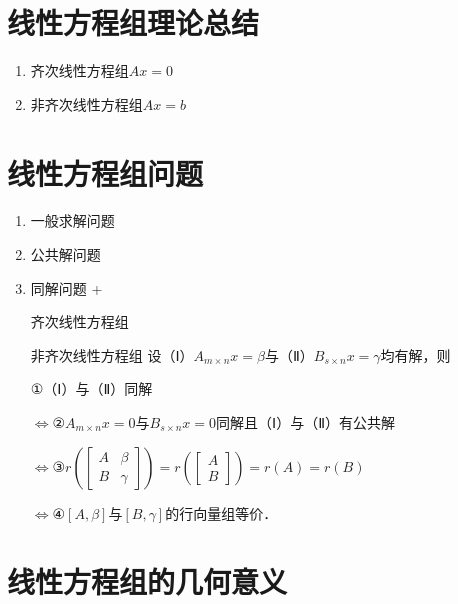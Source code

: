 \section{线性方程组理论总结}
\DOne
\begin{enumerate}
    \item 齐次线性方程组$Ax=0$ \DOne
    \item 非齐次线性方程组$Ax=b$ \DOne
\end{enumerate}


\section{线性方程组问题}
\begin{enumerate}
    \item 一般求解问题
    \item 公共解问题
    \item 同解问题
          \DOne+\DTwoTwo
          \begin{detail}{齐次线性方程组\DTwoTwo}{}
          \end{detail}

          \begin{detail}{非齐次线性方程组\DTwoTwo}{}
              设（\RomanSymbols Ⅰ）$A_{m\times n}x=\beta$与（Ⅱ）$B_{s\times n}x=\gamma$均有解，则

              ①（\RomanSymbols Ⅰ）与（Ⅱ）同解

              $\Leftrightarrow$②$A_{m\times n}x=0$与$B_{s\times n}x=0$同解且（\RomanSymbols Ⅰ）与（Ⅱ）有公共解

              $\Leftrightarrow$③$r\left(\begin{bmatrix}A & \beta \\ B & \gamma\end{bmatrix}\right)=r\left(\begin{bmatrix}A \\ B\end{bmatrix}\right)=r(A)=r(B)$

              $\Leftrightarrow$④$[A,\beta]$与$[B,\gamma]$的行向量组等价．
          \end{detail}
\end{enumerate}


\section{线性方程组的几何意义}


